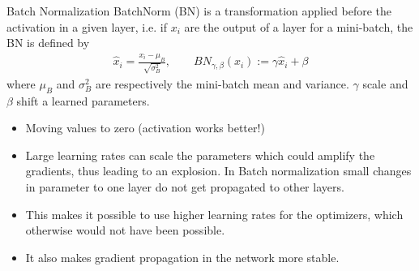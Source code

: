\documentclass[handout,xcolor=pdftex,dvipsnames,table,mathserif]{beamer}
\begin{document}



\begin{frame}{Batch Normalization \cite{ioffe2015batch}  \cite{mishkin2015all}}
BatchNorm (BN) is a transformation applied before the activation in a given layer, i.e. if $x_i$ are the output of a layer for a mini-batch, the BN is defined by
\begin{eqnarray*}
\hat{x}_i = \frac{x_i-\mu_{B}}{\sqrt{\sigma^2_B}}, \quad \quad
BN_{\gamma,\beta}(x_i):= \gamma \hat{x}_i + \beta
\end{eqnarray*}
where $\mu_{B}$ and $\sigma^2_B$ are respectively the mini-batch mean and variance. $\gamma$ scale and $\beta$ shift a learned parameters.
\begin{itemize}
\item Moving values to zero (activation works better!) 
\item Large learning rates can scale the parameters which could amplify the gradients, thus leading to an explosion. In Batch normalization small changes in parameter to one layer do not get propagated to other layers. 
\item This makes it possible to use higher learning rates for the optimizers, which otherwise would not have been possible. 
\item It also makes gradient propagation in the network more stable.
\end{itemize}
\end{frame}
\end{document}
